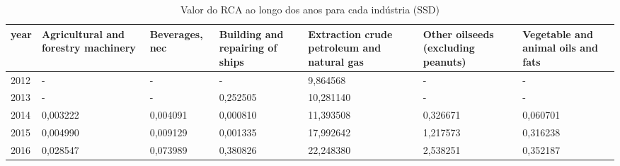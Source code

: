 \begin{table}
\centering
\caption{Valor do RCA ao longo dos anos para cada indústria (SSD)}
\begin{tabular}{p{1cm}p{2cm}p{2cm}p{2cm}p{2cm}p{2cm}p{2cm}}
\toprule
 year &  Agricultural and forestry machinery &  Beverages, nec &  Building and repairing of ships &  Extraction crude petroleum and natural gas &  Other oilseeds (excluding peanuts) &  Vegetable and animal oils and fats \\
\midrule
 2012 &                                    - &               - &                                - &                                    9,864568 &                                   - &                                   - \\
 2013 &                                    - &               - &                         0,252505 &                                   10,281140 &                                   - &                                   - \\
 2014 &                             0,003222 &        0,004091 &                         0,000810 &                                   11,393508 &                            0,326671 &                            0,060701 \\
 2015 &                             0,004990 &        0,009129 &                         0,001335 &                                   17,992642 &                            1,217573 &                            0,316238 \\
 2016 &                             0,028547 &        0,073989 &                         0,380826 &                                   22,248380 &                            2,538251 &                            0,352187 \\
\bottomrule
\end{tabular}
\end{table}
